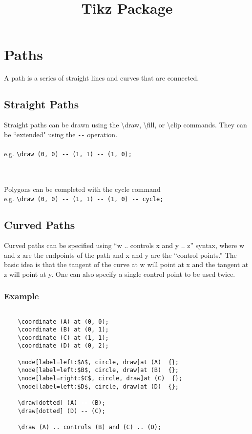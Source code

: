 \documentclass{article}
\title{\vspace{-4em}\textbf{Tikz Package}}
\date{}
\newcommand{\bs}{\textbackslash}
\begin{document}
\maketitle

\section*{Paths}
A path is a series of straight lines and curves that are connected.

\subsection*{Straight Paths}
Straight paths can be drawn using the \bs draw, \bs fill, or \bs clip commands. They can be ``extended" using the \verb|--| operation. 
~\\~\\
e.g. \verb|\draw (0, 0) -- (1, 1) -- (1, 0);| \\
~\\~\\
Polygons can be completed with the cycle command \\
e.g. \verb|\draw (0, 0) -- (1, 1) -- (1, 0) -- cycle;| \\

\subsection*{Curved Paths}
Curved paths can be specified using ``w .. controls x and y .. z'' syntax, where w and z are the endpoints of the path and x and y are the ``control points.'' The basic idea is that the tangent of the curve at w will point at x and the tangent at z will point at y. One can also specify a single control point to be used twice.
\subsubsection*{Example}

	\begin{verbatim}
	
	\coordinate (A) at (0, 0);
	\coordinate (B) at (0, 1);
	\coordinate (C) at (1, 1);
	\coordinate (D) at (0, 2);

	\node[label=left:$A$, circle, draw]at (A)  {};
	\node[label=left:$B$, circle, draw]at (B)  {};
	\node[label=right:$C$, circle, draw]at (C)  {};
	\node[label=left:$D$, circle, draw]at (D)  {};
	
	\draw[dotted] (A) -- (B);
	\draw[dotted] (D) -- (C);

	\draw (A) .. controls (B) and (C) .. (D);
	\end{verbatim}
\end{document}
